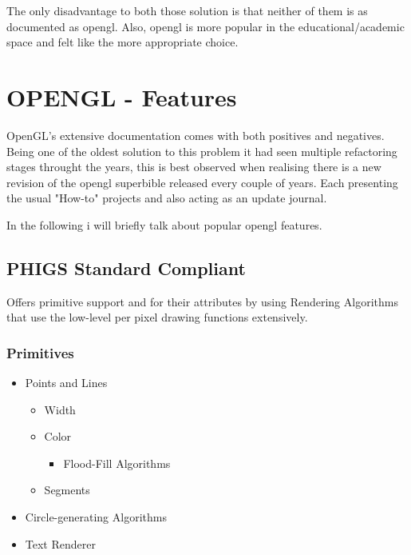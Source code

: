         The only disadvantage to both those solution is that neither of them is as documented as opengl. Also, opengl is more popular in the educational/academic space and felt like the more appropriate choice.

    \section*{OPENGL - Features}
        OpenGL's extensive documentation comes with both positives and negatives. Being one of the oldest solution to this problem it had seen multiple refactoring stages throught the years, this is best observed when realising there is a new revision of the opengl superbible released every couple of years. Each presenting the usual "How-to" projects and also acting as an update journal.

        \pagebreak

        In the following i will briefly talk about popular opengl features.

        \subsection*{PHIGS Standard Compliant}
            Offers primitive support and for their attributes by using Rendering Algorithms that use the low-level per pixel drawing functions extensively.

            \subsubsection*{Primitives}
                \begin{itemize}
                  \item Points and Lines
                  \begin{itemize}
                    \item Width
                    \item Color
                    \begin{itemize}
                      \item Flood-Fill Algorithms
                    \end{itemize}
                    \item Segments
                  \end{itemize}
                  \item Circle-generating Algorithms
                  \item Text Renderer
                \end{itemize}

